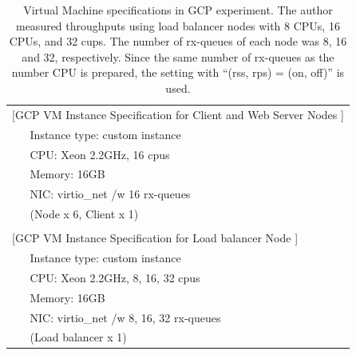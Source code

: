 {
\setlength{\tabcolsep}{3em}
\renewcommand{\arraystretch}{1.1}

\begin{table}[h]
  \centering
  \begin{tabular}{ll}
    \hline 
    \multicolumn{2}{l}{[GCP VM Instance Specification for Client and Web Server Nodes ]}   \\
    & Instance type: custom instance \\
    & CPU: Xeon 2.2GHz, 16 cpus \hspace{2cm} \\
    & Memory: 16GB \\
    & NIC: virtio\_net /w 16 rx-queues \\
    & (Node x 6, Client x 1) \\
    & \\
    \multicolumn{2}{l}{[GCP VM Instance Specification for Load balancer Node ]}   \\
    & Instance type: custom instance \\
    & CPU: Xeon 2.2GHz, 8, 16, 32 cpus \hspace{2cm} \\
    & Memory: 16GB \\
    & NIC: virtio\_net /w 8, 16, 32 rx-queues \\
    & (Load balancer x 1) \\
    \hline
  \end{tabular}
  \par\bigskip
  \centering
  \begin{minipage}{0.9\columnwidth}
    \caption[Virtual Machine specifications in GCP experiment]{
Virtual Machine specifications in GCP experiment.
The author measured throughputs using load balancer nodes with 8 CPUs, 16 CPUs, and 32 cups.
The number of rx-queues of each node was 8, 16 and 32, respectively.
Since the same number of rx-queues as the number CPU is prepared, the setting with \enquote{(rss, rps) = (on, off)} is used.
    }
    \label{fig:gcp_machine_spec}
  \end{minipage}
\end{table}
}

